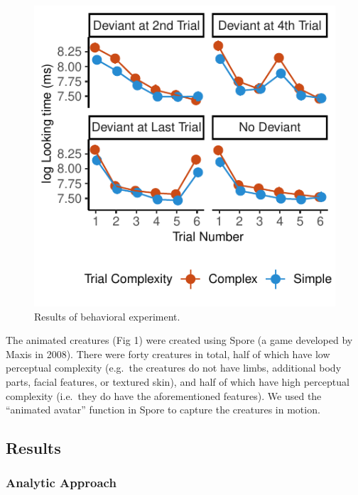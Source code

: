 \documentclass[10pt, letterpaper]{article}
\newenvironment{CodeChunk}{}{}
\begin{document}
\begin{CodeChunk}
\begin{figure}[h]

{\centering \includegraphics{figs/behavioral_result-1} 

}

\caption[Results of behavioral experiment]{Results of behavioral experiment.}\label{fig:behavioral_result}
\end{figure}
\end{CodeChunk}

The animated creatures (Fig 1) were created using Spore (a game
developed by Maxis in 2008). There were forty creatures in total, half
of which have low perceptual complexity (e.g.~the creatures do not have
limbs, additional body parts, facial features, or textured skin), and
half of which have high perceptual complexity (i.e.~they do have the
aforementioned features). We used the ``animated avatar'' function in
Spore to capture the creatures in motion.

\hypertarget{results}{%
\subsection{Results}\label{results}}

\hypertarget{analytic-approach}{%
\subsubsection{Analytic Approach}\label{analytic-approach}}
\end{document}
